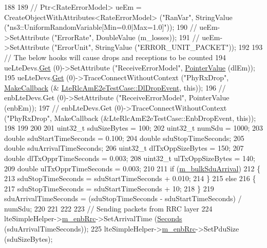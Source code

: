 \begin{DoxyCode}
188 
189 \textcolor{comment}{//   Ptr<RateErrorModel> ueEm = CreateObjectWithAttributes<RateErrorModel> ("RanVar", StringValue
       ("ns3::UniformRandomVariable[Min=0.0|Max=1.0]"));}
190 \textcolor{comment}{//   ueEm->SetAttribute ("ErrorRate", DoubleValue (m\_losses));}
191 \textcolor{comment}{//   ueEm->SetAttribute ("ErrorUnit", StringValue ("ERROR\_UNIT\_PACKET"));}
192 
193   \textcolor{comment}{// The below hooks will cause drops and receptions to be counted}
194   ueLteDevs.\hyperlink{classns3_1_1NetDeviceContainer_a677d62594b5c9d2dea155cc5045f4d0b}{Get} (0)->SetAttribute (\textcolor{stringliteral}{"ReceiveErrorModel"}, \hyperlink{classns3_1_1PointerValue}{PointerValue} (dlEm));
195   ueLteDevs.\hyperlink{classns3_1_1NetDeviceContainer_a677d62594b5c9d2dea155cc5045f4d0b}{Get} (0)->TraceConnectWithoutContext (\textcolor{stringliteral}{"PhyRxDrop"}, \hyperlink{group__makecallbackmemptr_ga9376283685aa99d204048d6a4b7610a4}{MakeCallback} (&
      \hyperlink{classLteRlcAmE2eTestCase_a29f5f21aa4f70fe42aaa5315c2f6a444}{LteRlcAmE2eTestCase::DlDropEvent}, \textcolor{keyword}{this}));
196 \textcolor{comment}{//   enbLteDevs.Get (0)->SetAttribute ("ReceiveErrorModel", PointerValue (enbEm));}
197 \textcolor{comment}{//   enbLteDevs.Get (0)->TraceConnectWithoutContext ("PhyRxDrop", MakeCallback
       (&LteRlcAmE2eTestCase::EnbDropEvent, this));}
198 
199 
200 
201   uint32\_t sduSizeBytes = 100;
202   uint32\_t numSdu = 1000;
203   \textcolor{keywordtype}{double} sduStartTimeSeconds = 0.100;
204   \textcolor{keywordtype}{double} sduStopTimeSeconds;
205   \textcolor{keywordtype}{double} sduArrivalTimeSeconds;
206   uint32\_t dlTxOppSizeBytes = 150;
207   \textcolor{keywordtype}{double} dlTxOpprTimeSeconds = 0.003;
208   uint32\_t ulTxOppSizeBytes = 140;
209   \textcolor{keywordtype}{double} ulTxOpprTimeSeconds = 0.003;
210 
211   \textcolor{keywordflow}{if} (\hyperlink{classLteRlcAmE2eTestCase_a401b57783a0a1908adcf7a087757fb83}{m\_bulkSduArrival})
212     \{
213       sduStopTimeSeconds = sduStartTimeSeconds + 0.010;
214     \}
215   \textcolor{keywordflow}{else}
216     \{
217       sduStopTimeSeconds = sduStartTimeSeconds + 10;
218     \}
219   sduArrivalTimeSeconds = (sduStopTimeSeconds - sduStartTimeSeconds) / numSdu;
220   
221   
222 
223   \textcolor{comment}{// Sending packets from RRC layer}
224   lteSimpleHelper->\hyperlink{classns3_1_1LteSimpleHelper_a89ce7ea3468b4cbea029490a6451052e}{m\_enbRrc}->SetArrivalTime (\hyperlink{group__timecivil_ga33c34b816f8ff6628e33d5c8e9713b9e}{Seconds} (sduArrivalTimeSeconds));
225   lteSimpleHelper->\hyperlink{classns3_1_1LteSimpleHelper_a89ce7ea3468b4cbea029490a6451052e}{m\_enbRrc}->SetPduSize (sduSizeBytes);

\end{DoxyCode}
